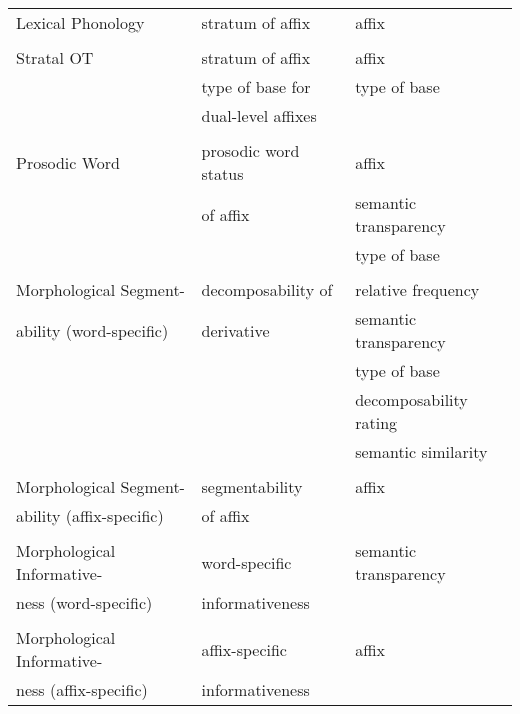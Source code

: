 {\begin{table*}[b!]
\begin{center}
\begin{tabularx}{\textwidth}{lll}
			Lexical Phonology 									& stratum of affix &affix\\ 
			\\
			Stratal OT 													& stratum of affix& affix\\ 
			&type of base for & type of base\\ 
			&dual-level affixes& \\ 
			\\
			Prosodic Word										 & prosodic word status & affix \\ 
			& 						of affix								&  semantic transparency\\ 
			& 														& type of base \\ 
			\\
			Morphological Segment- &decomposability of &  relative frequency \\ 
			ability (word-specific)															& 	derivative 													& semantic transparency \\
			&														& type of base \\
			&														& decomposability rating\\
			&														& semantic similarity\\
			
			\\															
			Morphological Segment-&segmentability &   affix\\	
			ability (affix-specific) &of affix	& \\																	
			\\
			Morphological Informative-& word-specific  & semantic transparency\\
			ness (word-specific) &informativeness& \\																	 
			\\
			Morphological Informative- & affix-specific &  affix \\
			ness (affix-specific) &informativeness& \\																	 
			

			\hline
			

		\end{tabularx}
	\end{center}

\end{table*}




}
